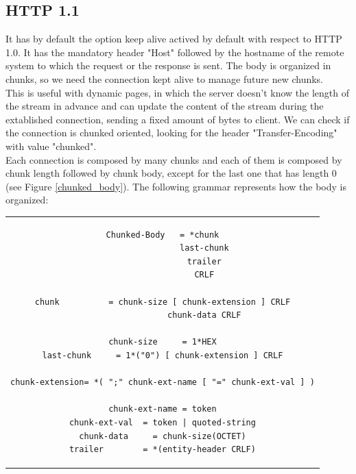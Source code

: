 \subsection{HTTP 1.1}
It has by default the option keep alive actived by default with respect to HTTP 1.0. It has the mandatory header "Host" followed by the hostname of the remote system to which the request or the response is sent. The body is organized in chunks, so we need the connection kept alive to manage future new chunks.\\
This is useful with dynamic pages, in which the server doesn't know the length of the stream in advance and can update the content of the stream during the extablished connection, sending a fixed amount of bytes to client. We can check if the connection is chunked oriented, looking for the header "Transfer-Encoding" with value "chunked".\\ 
Each connection is composed by many chunks and each of them is composed by chunk length followed by chunk body, except for the last one that has length 0 (see Figure \ref{chunked_body}). The following grammar represents how the body is organized:
\begin{center}
\begin{tabular}{c}
\begin{lstlisting}[linewidth=320pt, basicstyle=\footnotesize\sffamily,]
Chunked-Body   = *chunk
                 last-chunk
                 trailer
                 CRLF

chunk          = chunk-size [ chunk-extension ] CRLF
                 chunk-data CRLF

chunk-size     = 1*HEX
last-chunk     = 1*("0") [ chunk-extension ] CRLF

chunk-extension= *( ";" chunk-ext-name [ "=" chunk-ext-val ] )

chunk-ext-name = token
chunk-ext-val  = token | quoted-string
chunk-data     = chunk-size(OCTET)
trailer        = *(entity-header CRLF)
\end{lstlisting}
\end{tabular}
\end{center}

